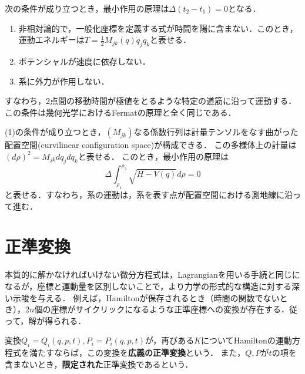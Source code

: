 \documentclass[uplatex, dvipdfmx]{jsreport}
\begin{document}
\begin{proposition}[幾何光学のFermatの原理との類似性]
    次の条件が成り立つとき，最小作用の原理は$\Delta(t_2-t_1)=0$となる．
    \begin{enumerate}
        \item 非相対論的で，一般化座標を定義する式が時間を陽に含まない．このとき，運動エネルギーは$T=\frac{1}{2}M_{jk}(q)\dot{q}_j\dot{q}_k$と表せる．
        \item ポテンシャルが速度に依存しない．
        \item 系に外力が作用しない．
    \end{enumerate}
    すなわち，2点間の移動時間が極値をとるような特定の道筋に沿って運動する．
    この条件は幾何光学におけるFermatの原理と全く同じである．
\end{proposition}

\begin{theorem}[Jacobi形の最小作用の原理]
    (1)の条件が成り立つとき，$(M_{jk})$なる係数行列は計量テンソルをなす曲がった配置空間(curvilinear configuration space)が構成できる．
    この多様体上の計量は$(d\rho)^2=M_{jk}dq_jdq_k$と表せる．
    このとき，最小作用の原理は
    \[\Delta\int^{\rho_2}_{\rho_1}\sqrt{H-V(q)}d\rho=0\]
    と表せる．すなわち，系の運動は，系を表す点が配置空間における測地線に沿って進む．
\end{theorem}

\section{正準変換}

\begin{tcolorbox}[colframe=ForestGreen, colback=ForestGreen!10!white,breakable,colbacktitle=ForestGreen!40!white,coltitle=black,fonttitle=\bfseries\sffamily,
title=]
    本質的に解かなければいけない微分方程式は，Lagrangianを用いる手続と同じになるが，座標と運動量を区別しないことで，より力学の形式的な構造に対する深い示唆を与える．
    例えば，Hamiltonが保存されるとき（時間の関数でないとき），$2n$個の座標がサイクリックになるような正準座標への変換が存在する．従って，解が得られる．
\end{tcolorbox}

\begin{definition}
    変換$Q_i=Q_i(q,p,t),P_i=P_i(q,p,t)$が，再びある$K$についてHamiltonの運動方程式を満たすならば，この変換を\textbf{広義の正準変換}という．
    また，$Q,P$が$t$の項を含まないとき，\textbf{限定された}正準変換であるという．
\end{definition}
\end{document}
